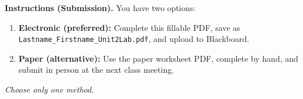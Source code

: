 \noindent\textbf{Instructions (Submission).} You have two options:
\begin{enumerate}[leftmargin=*]
  \item \textbf{Electronic (preferred):} Complete this fillable PDF, save as \texttt{Lastname\_Firstname\_Unit2Lab.pdf}, and upload to Blackboard.
  \item \textbf{Paper (alternative):} Use the paper worksheet PDF, complete by hand, and submit in person at the next class meeting.
\end{enumerate}
\textit{Choose only one method.}
